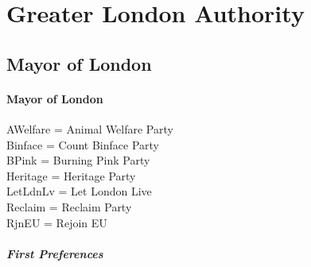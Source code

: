 \part{Greater London Authority}

\chapter{Mayor of London}

\subsection*{Mayor of London}

AWelfare = Animal Welfare Party\\
Binface = Count Binface Party\\
BPink = Burning Pink Party\\
Heritage = Heritage Party\\
LetLdnLv = Let London Live\\
Reclaim = Reclaim Party\\
RjnEU = Rejoin EU



\subsubsection*{First Preferences}

